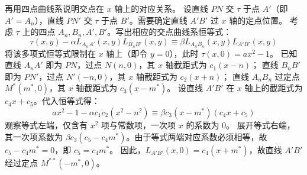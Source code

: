 \begin{solution}
再用四点曲线系说明交点在 $x$ 轴上的对应关系。
设直线 $P N$ 交 $\tau$ 于点 $A'$（即 $A' = A_n$），直线 $P N'$ 交 $\tau$ 于点 $B'$。需要确定直线 $A' B'$ 过 $x$ 轴的定点位置。
考虑 $\tau$ 上的四点 $A_n, B_n, A', B'$。写出相应的交点曲线系恒等式：
$$ \tau(x, y) - \alpha L_{A_n A'}(x, y) L_{B_n B'}(x, y) \equiv \beta L_{A_n B_n}(x, y) L_{A' B'}(x, y) $$
将该多项式恒等式限制在 $x$ 轴上（即令 $y=0$），此时 $\tau(x, 0) = a x^2 - 1$。
已知直线 $A_n A'$ 即为 $P N$，过点 $N(n,0)$，其 $x$ 轴截距式为 $c_1(x-n)$；
直线 $B_n B'$ 即为 $P N'$，过点 $N'(-n,0)$，其 $x$ 轴截距式为 $c_2(x+n)$；
直线 $A_n B_n$ 过定点 $M^*(m^*, 0)$，其 $x$ 轴截距式为 $c_3(x-m^*)$。
设直线 $A' B'$ 在 $x$ 轴上的截距式为 $c_4 x + c_5$。代入恒等式得：
$$ a x^2 - 1 - \alpha c_1 c_2 (x^2 - n^2) \equiv \beta c_3 (x - m^*) (c_4 x + c_5) $$
观察等式左端，仅含有 $x^2$ 项与常数项，一次项 $x$ 的系数为 $0$。
展开等式右端，其一次项系数为 $\beta c_3 (c_5 - c_4 m^*)$。由于等式两端对应系数必须相等，故 $c_5 - c_4 m^* = 0$，即 $c_5 = c_4 m^*$。
因此，$L_{A' B'}(x, 0) = c_4(x + m^*)$，故直线 $A' B'$ 经过定点 $M^{**}(-m^*, 0)$。


\end{solution}
